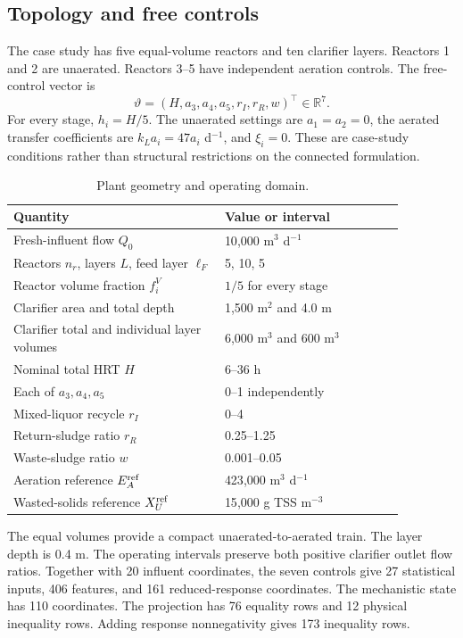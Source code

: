 \subsection{Topology and free controls}

The case study has five equal-volume reactors and ten clarifier layers. Reactors 1 and 2 are unaerated. Reactors 3--5 have independent aeration controls. The free-control vector is
\begin{equation}
\vartheta=(H,a_3,a_4,a_5,r_I,r_R,w)^\top\in\mathbb R^7.
\label{eq:plant_case_controls}
\end{equation}
For every stage, $h_i=H/5$. The unaerated settings are $a_1=a_2=0$, the aerated transfer coefficients are $k_La_i=47a_i$ d$^{-1}$, and $\xi_i=0$. These are case-study conditions rather than structural restrictions on the connected formulation.

\begin{table}[htbp]
\centering\small
\caption{Plant geometry and operating domain.}
\label{tab:plant_operating_domain}
\begin{tabular}{p{0.47\linewidth}p{0.40\linewidth}}
\toprule
Quantity & Value or interval\\
\midrule
Fresh-influent flow $Q_0$ & 10{,}000 m$^3$ d$^{-1}$\\
Reactors $n_r$, layers $L$, feed layer $\ell_F$ & 5, 10, 5\\
Reactor volume fraction $f_i^V$ & $1/5$ for every stage\\
Clarifier area and total depth & 1{,}500 m$^2$ and 4.0 m\\
Clarifier total and individual layer volumes & 6{,}000 m$^3$ and 600 m$^3$\\
Nominal total HRT $H$ & 6--36 h\\
Each of $a_3,a_4,a_5$ & 0--1 independently\\
Mixed-liquor recycle $r_I$ & 0--4\\
Return-sludge ratio $r_R$ & 0.25--1.25\\
Waste-sludge ratio $w$ & 0.001--0.05\\
Aeration reference $E_A^{\rm ref}$ & 423{,}000 m$^3$ d$^{-1}$\\
Wasted-solids reference $X_U^{\rm ref}$ & 15{,}000 g TSS m$^{-3}$\\
\bottomrule
\end{tabular}
\end{table}

The equal volumes provide a compact unaerated-to-aerated train. The layer depth is 0.4 m. The operating intervals preserve both positive clarifier outlet flow ratios. Together with 20 influent coordinates, the seven controls give 27 statistical inputs, 406 features, and 161 reduced-response coordinates. The mechanistic state has 110 coordinates. The projection has 76 equality rows and 12 physical inequality rows. Adding response nonnegativity gives 173 inequality rows.


